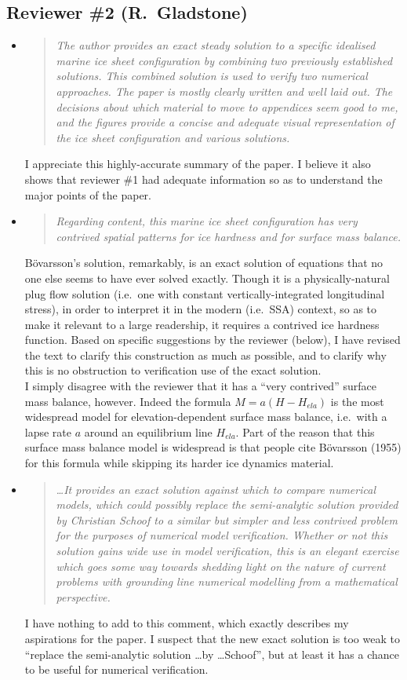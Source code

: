 \documentclass[11pt,reqno]{amsart}
\renewcommand{\dh}{\fontencoding{T1}\selectfont{\symbol{240}}}
\newcommand{\bod}{B\"o\dh varsson\xspace}
\newcommand{\citebod}{B\"o\dh varsson (1955)\nocite{Bodvardsson}\xspace}
\newcommand{\reply}[2]{
\medskip\medskip
\item  \begin{quote}
\emph{#1}
\end{quote}

\medskip
\noindent #2}
\begin{document}
\subsection*{Reviewer \#2 (R.~Gladstone)}  \begin{itemize}
\reply{The author provides an exact steady solution to a specific idealised marine ice sheet configuration by combining two previously established solutions. This combined solution is used to verify two numerical approaches. The paper is mostly clearly written and well laid out. The decisions about which material to move to appendices seem good to me, and the figures provide a concise and adequate visual representation of the ice sheet configuration and various solutions.}
{I appreciate this highly-accurate summary of the paper.  I believe it also shows that reviewer \#1 had adequate information so as to understand the major points of the paper.}

\reply{Regarding content, this marine ice sheet configuration has very contrived spatial patterns for ice hardness and for surface mass balance.}
{\bod's solution, remarkably, is an exact solution of equations that no one else seems to have ever solved exactly.  Though it is a physically-natural plug flow solution (i.e.~one with constant vertically-integrated longitudinal stress), in order to interpret it in the modern (i.e.~SSA) context, so as to make it relevant to a large readership, it requires a contrived ice hardness function.  Based on specific suggestions by the reviewer (below), I have revised the text to clarify this construction as much as possible, and to clarify why this is no obstruction to verification use of the exact solution. \medskip \\
I simply disagree with the reviewer that it has a ``very contrived'' surface mass balance, however.  Indeed the formula $M=a(H-H_{ela})$ is the most widespread model for elevation-dependent surface mass balance, i.e.~with a lapse rate $a$ around an equilibrium line $H_{ela}$.  Part of the reason that this surface mass balance model is widespread is that people cite \citebod for this formula while skipping its harder ice dynamics material.}

\reply{\dots It provides an exact solution against which to compare numerical models, which could possibly replace the semi-analytic solution provided by Christian Schoof to a similar but simpler and less contrived problem for the purposes of numerical model verification.  Whether or not this solution gains wide use in model verification, this is an elegant exercise which goes some way towards shedding light on the nature of current problems with grounding line numerical modelling from a mathematical perspective.}
{I have nothing to add to this comment, which exactly describes my aspirations for the paper.  I suspect that the new exact solution is too weak to ``replace the semi-analytic solution \dots by \dots Schoof'', but at least it has a chance to be useful for numerical verification.}


\end{itemize}
\end{document}
